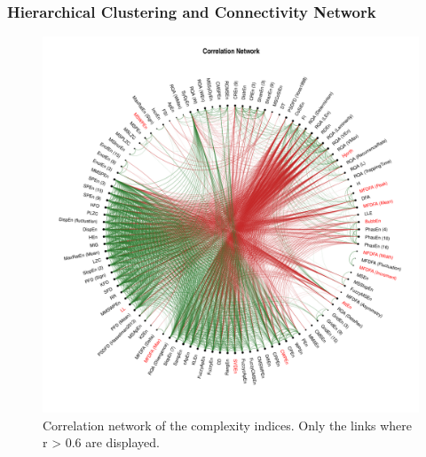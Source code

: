 \documentclass[
  man]{apa6}
\begin{document}
\hypertarget{hierarchical-clustering-and-connectivity-network}{%
\subsubsection{Hierarchical Clustering and Connectivity Network}\label{hierarchical-clustering-and-connectivity-network}}

\begin{figure}
\centering
\includegraphics{./figures/ggm-1.pdf}
\caption{\label{fig:ggm}Correlation network of the complexity indices. Only the links where \textbar r\textbar{} \textgreater{} 0.6 are displayed.}
\end{figure}
\end{document}
